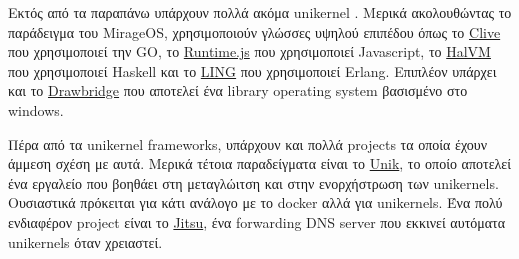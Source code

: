 Εκτός από τα παραπάνω υπάρχουν πολλά ακόμα unikernel . Μερικά
ακολουθώντας το παράδειγμα του MirageOS, χρησιμοποιούν γλώσσες υψηλού επιπέδου
όπως το \href{http://lsub.org/ls/clive.html}{Clive} που χρησιμοποιεί την GO, το
\href{http://runtimejs.org/}{Runtime.js} που χρησιμοποιεί Javascript, το
\href{http://galois.com/project/halvm/}{HalVM} που χρησιμοποιεί Haskell και το
\href{http://erlangonxen.org/}{LING} που χρησιμοποιεί Erlang. Επιπλέον
υπάρχει και το
\href{http://research.microsoft.com/en-us/projects/drawbridge/}{Drawbridge} που
αποτελεί ένα library operating system βασισμένο στο windows. 

Πέρα από τα unikernel frameworks, υπάρχουν και πολλά projects τα οποία έχουν
άμμεση σχέση με αυτά. Μερικά τέτοια παραδείγματα είναι το
\href{https://github.com/emc-advanced-dev/unik}{Unik}, το οποίο αποτελεί ένα
εργαλείο που βοηθάει στη μεταγλώιτση και στην ενορχήστρωση των unikernels.
Ουσιαστικά πρόκειται για κάτι ανάλογο με το docker αλλά για unikernels. Ένα πολύ
ενδιαφέρον project είναι το \href{https://github.com/mirage/jitsu}{Jitsu}, ένα
forwarding DNS server που εκκινεί αυτόματα unikernels όταν χρειαστεί.  
